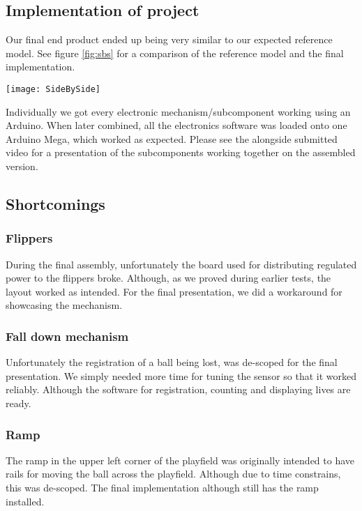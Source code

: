 
\subsection{Implementation of project}
Our final end product ended up being very similar to our expected reference model. See figure \ref{fig:sbs} for a comparison of the reference model and the final implementation.
\begin{figure*}[h]
	\texttt{[image: SideBySide]}
	\caption{Side by side view of reference model (left) and image of final implementation (right). See Fusion 360 model named FinalAssembly for reference model.}
	\label{fig:sbs}
\end{figure*}
Individually we got every electronic mechanism/subcomponent working using an Arduino. When later combined, all the electronics software was loaded onto one Arduino Mega, which worked as expected. Please see the alongside submitted video for a presentation of the subcomponents working together on the assembled version.
\subsection{Shortcomings}
\subsubsection{Flippers}
During the final assembly, unfortunately the board used for distributing regulated power to the flippers broke. Although, as we proved during earlier tests, the layout worked as intended. For the final presentation, we did a workaround for showcasing the mechanism.
\subsubsection{Fall down mechanism}
Unfortunately the registration of a ball being lost, was de-scoped for the final presentation. We simply needed more time for tuning the sensor so that it worked reliably. Although the software for registration, counting and displaying lives are ready. 
\subsubsection{Ramp}
The ramp in the upper left corner of the playfield was originally intended to have rails for moving the ball across the playfield. Although due to time constrains, this was de-scoped. The final implementation although still has the ramp installed.

